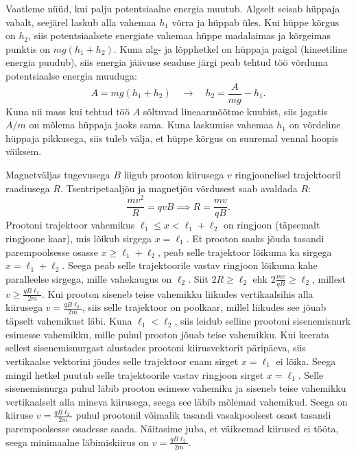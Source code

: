 \documentclass[10pt]{article}
\begin{document}
Vaatleme nüüd, kui palju potentsiaalne energia muutub. Algselt seisab hüppaja vabalt, seejärel laskub alla vahemaa $h_1$ võrra ja hüppab üles. Kui hüppe kõrgus on $h_2$, siis potentsiaalsete energiate vahemaa hüppe madalaimas ja kõrgeimas punktis on $mg(h_1+h_2)$. Kuna alg- ja lõpphetkel on hüppaja paigal (kineetiline energia puudub), siis energia jäävuse seaduse järgi peab tehtud töö võrduma potentsiaalse energia muuduga:
$$A = mg(h_1+h_2) \quad\rightarrow\quad h_2 = \frac{A}{mg} - h_1.$$
Kuna nii mass kui tehtud töö $A$ sõltuvad lineaarmõõtme kuubist, siis jagatis $A/m$ on mõlema hüppaja jaoks sama. Kuna laskumise vahemaa $h_1$ on võrdeline hüppaja pikkusega, siis tuleb välja, et hüppe kõrgus on suuremal vennal hoopis väiksem.
\probend
\bigskip


\solu
Magnetväljas tugevusega $B$ liigub prooton kiirusega $v$ ringjoonelisel trajektooril raadiusega $R$. Tsentripetaaljõu ja magnetjõu võrdusest saab avaldada $R$:
\[\frac{mv^2}{R}=qvB\implies R=\frac{mv}{qB}.\]
Prootoni trajektoor vahemikus $\ell_1\leq x < \ell_1+\ell_2$ on ringjoon (täpsemalt ringjoone kaar), mis lõikub sirgega $x=\ell_1$. Et prooton saaks jõuda tasandi parempoolsesse osasse $x\geq \ell_1+\ell_2$, peab selle trajektoor lõikuma ka sirgega $x=\ell_1+\ell_2$. Seega peab selle trajektoorile vastav ringjoon lõikuma kahe paralleelse sirgega, mille vahekaugus on $\ell_2$. Siit $2R \geq \ell_2$ ehk $2\frac{mv}{qB}\geq \ell_2$, millest $v\geq \frac{qB\ell_2}{2m}$. Kui prooton siseneb teise vahemikku liikudes vertikaalsihis alla kiirusega $v= \frac{qB\ell_2}{2m}$, siis selle trajektoor on poolkaar, millel liikudes see jõuab täpselt vahemikust läbi. Kuna $\ell_1<\ell_2$, siis leidub selline prootoni sisenemisnurk esimesse vahemikku, mille puhul prooton jõuab teise vahemikku. Kui keerata sellest sisenemisnurgast alustades prootoni kiirusvektorit päripäeva, siis vertikaalse vektorini jõudes selle trajektoor enam sirget $x=\ell_1$ ei lõika. Seega mingil hetkel puutub selle trajektoorile vastav ringjoon sirget $x=\ell_1$. Selle sisenemisnurga puhul läbib prooton esimese vahemiku ja siseneb teise vahemikku vertikaalselt alla mineva kiirusega, seega see läbib mõlemad vahemikud. Seega on kiiruse $v=\frac{qB\ell_2}{2m}$ puhul prootonil võimalik tasandi vasakpoolsest osast tasandi parempoolsesse osadesse saada. Näitasime juba, et väiksemad kiirused ei tööta, seega minimaalne läbimiskiirus on $v=\frac{qB\ell_2}{2m}$.
\end{document}
